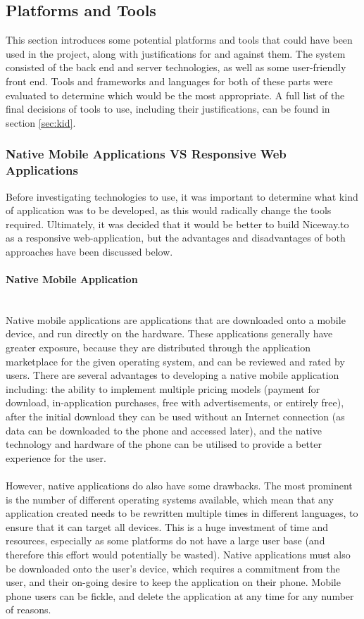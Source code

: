 \newpage 
\subsection{Platforms and Tools}
\label{sec:pat}
This section introduces some potential platforms and tools that could have been used in the project, along with justifications for and against them. The system consisted of the back end and server technologies, as well as some user-friendly front end. Tools and frameworks and languages for both of these parts were evaluated to determine which would be the most appropriate. A full list of the final decisions of tools to use, including their justifications, can be found in section \ref{sec:kid}.

\subsubsection{Native Mobile Applications VS Responsive Web Applications}
Before investigating technologies to use, it was important to determine what kind of application was to be developed, as this would radically change the tools required. Ultimately, it was decided that it would be better to build Niceway.to as a responsive web-application, but the advantages and disadvantages of both approaches have been discussed below.

\paragraph{Native Mobile Application}\ \\
Native mobile applications are applications that are downloaded onto a mobile device, and run directly on the hardware. These applications generally have greater exposure, because they are distributed through the application marketplace for the given operating system, and can be reviewed and rated by users. There are several advantages to developing a native mobile application including: the ability to implement multiple pricing models (payment for download, in-application purchases, free with advertisements, or entirely free), after the initial download they can be used without an Internet connection (as data can be downloaded to the phone and accessed later), and the native technology and hardware of the phone can be utilised to provide a better experience for the user.\ \\
\ \\
However, native applications do also have some drawbacks. The most prominent is the number of different operating systems available, which mean that any application created needs to be rewritten multiple times in different languages, to ensure that it can target all devices. This is a huge investment of time and resources, especially as some platforms do not have a large user base (and therefore this effort would potentially be wasted). Native applications must also be downloaded onto the user's device, which requires a commitment from the user, and their on-going desire to keep the application on their phone. Mobile phone users can be fickle, and delete the application at any time for any number of reasons. 


